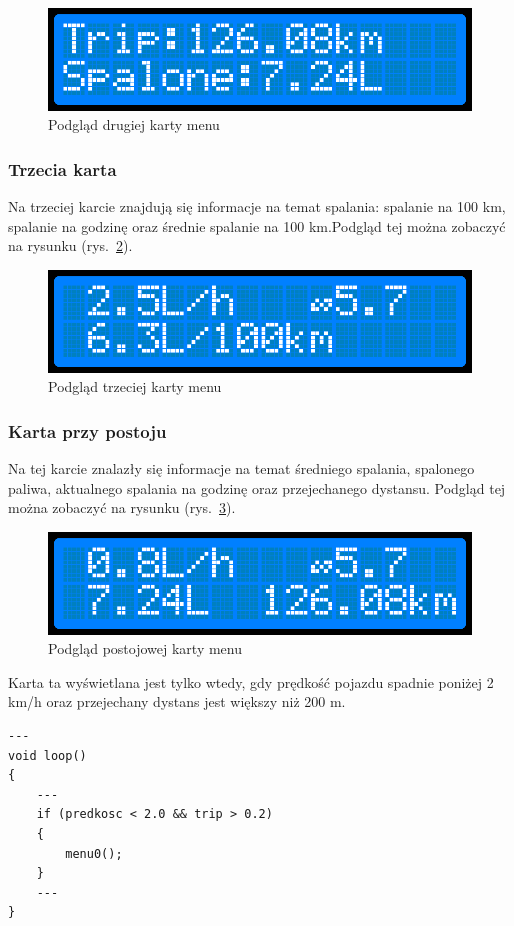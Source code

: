 \begin{figure}[h]
\centering
\includegraphics[width=0.7\linewidth]{Rysunki/menu2.png}
\caption{Podgląd drugiej karty menu}
\label{fig:menu2}
\end{figure}

\subsubsection{Trzecia karta}
Na trzeciej karcie znajdują się informacje na temat spalania: spalanie na 100 km, spalanie na godzinę oraz średnie spalanie na 100 km.Podgląd tej można zobaczyć na rysunku (rys.~\ref{fig:menu3}).

\begin{figure}[h]
\centering
\includegraphics[width=0.7\linewidth]{Rysunki/menu3.png}
\caption{Podgląd trzeciej karty menu}
\label{fig:menu3}
\end{figure}


\subsubsection{Karta przy postoju}
Na tej karcie znalazły się informacje na temat średniego spalania, spalonego paliwa, aktualnego spalania na godzinę oraz przejechanego dystansu. Podgląd tej można zobaczyć na rysunku (rys.~\ref{fig:menu0}).

\begin{figure}[h]
\centering
\includegraphics[width=0.7\linewidth]{Rysunki/menu0.png}
\caption{Podgląd postojowej karty menu}
\label{fig:menu0}
\end{figure}

Karta ta wyświetlana jest tylko wtedy, gdy prędkość pojazdu spadnie poniżej 2 km/h oraz przejechany dystans jest większy niż 200 m.
\begin{lstlisting}[label=list:menu_card4,caption=Włączanie karty podczas postoju,
basicstyle=\footnotesize\ttfamily]
---
void loop()
{
    ---
    if (predkosc < 2.0 && trip > 0.2)
    {
        menu0();
    }
    ---
}
\end{lstlisting}



